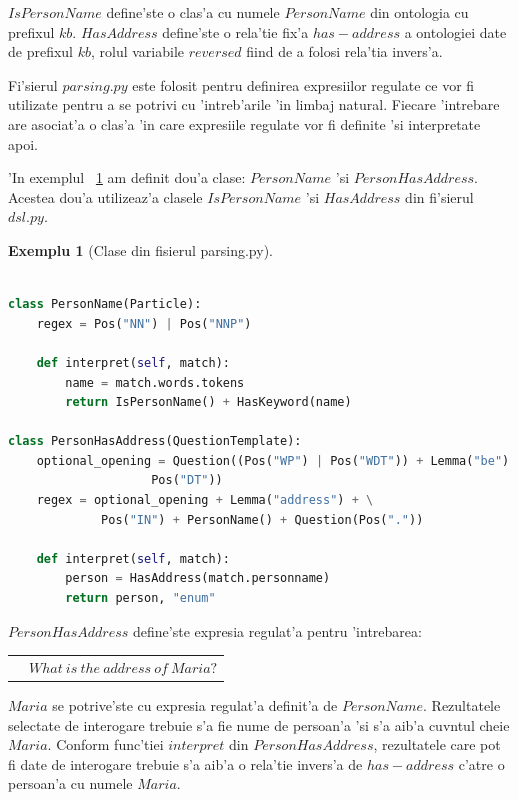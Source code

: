 \documentclass[12pt,a4paper,twoside]{report}
\newtheorem{example}{Exemplu}
\begin{document}
$IsPersonName$ define'ste o clas'a cu numele $PersonName$ din ontologia cu prefixul $kb$. $HasAddress$ define'ste o rela'tie fix'a $has-address$ a ontologiei date de prefixul $kb$, rolul variabile $reversed$ fiind de a folosi rela'tia invers'a.

Fi'sierul $parsing.py$ este folosit pentru definirea expresiilor regulate ce vor fi utilizate pentru a se potrivi cu 'intreb'arile 'in limbaj natural. Fiecare 'intrebare are asociat'a o clas'a 'in care expresiile regulate vor fi definite 'si interpretate apoi.

'In exemplul ~\ref{ex:parsing} am definit dou'a clase: $PersonName$ 'si $PersonHasAddress$. Acestea dou'a utilizeaz'a clasele $IsPersonName$ 'si $HasAddress$ din fi'sierul $dsl.py$.
\begin{example}[Clase din fisierul parsing.py]
\begin{lstlisting}[basicstyle=\footnotesize, language = Python]

class PersonName(Particle):
    regex = Pos("NN") | Pos("NNP")

    def interpret(self, match):
        name = match.words.tokens
        return IsPersonName() + HasKeyword(name)
    
class PersonHasAddress(QuestionTemplate):
    optional_opening = Question((Pos("WP") | Pos("WDT")) + Lemma("be") +
                    Pos("DT"))
    regex = optional_opening + Lemma("address") + \
             Pos("IN") + PersonName() + Question(Pos("."))

    def interpret(self, match):
        person = HasAddress(match.personname)
        return person, "enum"

\end{lstlisting}
\label{ex:parsing}
\end{example}

$PersonHasAddress$ define'ste expresia regulat'a pentru 'intrebarea:

\begin{tabular}{ll}
 & $What\ is\ the\ address\ of\ Maria?$
\end{tabular}


$Maria$ se potrive'ste cu expresia regulat'a definit'a de $PersonName$. Rezultatele selectate de interogare trebuie s'a fie nume de persoan'a 'si s'a aib'a cuv\ia ntul cheie $Maria$. Conform func'tiei $interpret$ din $PersonHasAddress$, rezultatele care pot fi date de interogare trebuie s'a aib'a o rela'tie invers'a de $has-address$ c'atre o persoan'a cu numele $Maria$.
\end{document}
